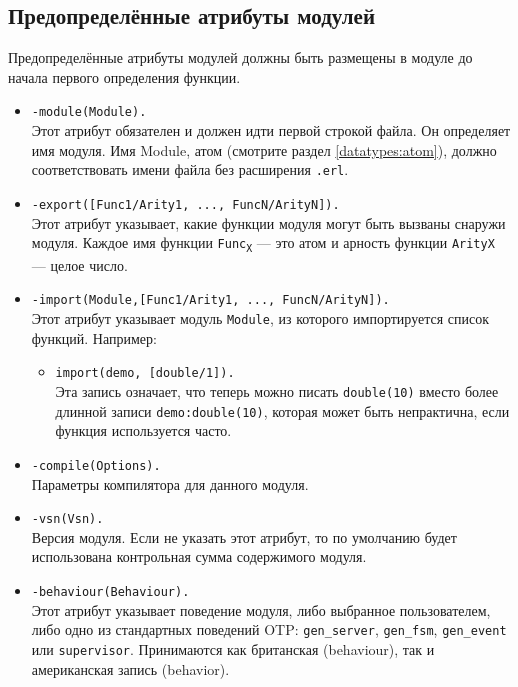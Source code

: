\subsection{Предопределённые атрибуты модулей}
Предопределённые атрибуты модулей должны быть размещены в модуле до начала первого
определения функции.

\begin{itemize}

	\item \verb|-module(Module).|\hfill\\
	Этот атрибут обязателен и должен идти первой строкой файла. Он определяет имя
	модуля. Имя Module, атом (смотрите раздел \ref{datatypes:atom}),
    должно соответствовать имени файла без расширения \texttt{.erl}.

	\item \verb|-export([Func1/Arity1, ..., FuncN/ArityN]).|\hfill\\
	Этот атрибут указывает, какие функции модуля могут быть вызваны снаружи модуля. Каждое имя функции \texttt{Func\textsubscript{X}} --- это атом и арность функции
	\texttt{ArityX} --- целое число.

	\item \verb|-import(Module,[Func1/Arity1, ..., FuncN/ArityN]).|\hfill\\
	Этот атрибут указывает модуль \texttt{Module}, из которого импортируется список
	функций. Например:

	\begin{itemize}
	\item \verb|import(demo, [double/1]).|\hfill\\
	Эта запись означает, что теперь можно писать \texttt{double(10)} вместо более
	длинной записи \texttt{demo:double(10)}, которая может быть непрактична, если
	функция используется часто.
	\end{itemize}

	\item \verb|-compile(Options).|\hfill\\
	Параметры компилятора для данного модуля.

	\item \verb|-vsn(Vsn).|\hfill\\
	Версия модуля. Если не указать этот атрибут, то по умолчанию будет использована
	контрольная сумма содержимого модуля.

	\item \verb|-behaviour(Behaviour).|\hfill\\
	Этот атрибут указывает поведение модуля, либо выбранное пользователем, либо 
	одно из стандартных поведений OTP: \texttt{gen\_server}, \texttt{gen\_fsm},
	\texttt{gen\_event} или \texttt{supervisor}. Принимаются как британская 
	(behaviour), так и американская запись (behavior).
\end{itemize}



